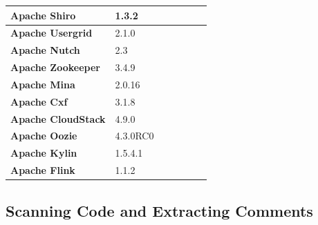 \begin{landscape}
\begin{table}[htbp]
\begin{adjustbox}{width=1.3\textwidth}
\begin{tabular}{l|l|l|c|c|c|c}
				\textbf{Apache Shiro}      & ‎1.3.2           &                           &                           &                   &                        &  \\ \hline
				\textbf{Apache Usergrid}   & 2.1.0            &                           &                           &                   &                        &  \\ \hline
				\textbf{Apache Nutch}      & 2.3              &                           &                           &                   &                        &  \\ \hline
				\textbf{Apache Zookeeper}  & 3.4.9            &                           &                           &                   &                        &  \\ \hline
				\textbf{Apache Mina}       & 2.0.16           &                           &                           &                   &                        &  \\ \hline
				\textbf{Apache Cxf}        & 3.1.8            &                           &                           &                   &                        &  \\ \hline
				\textbf{Apache CloudStack} & 4.9.0            &                           &                           &                   &                        &  \\ \hline
				\textbf{Apache Oozie}      & 4.3.0RC0         &                           &                           &                   &                        &  \\ \hline
				\textbf{Apache Kylin}      & 1.5.4.1          &                           &                           &                   &                        &  \\ \hline
				\textbf{Apache Flink}      & 1.1.2            &                           &                           &                   &                        &  \\ \hline
			\end{tabular}
			\label{table:ch4_projects_statistics_2}
			
		\end{adjustbox}
		
	\end{table}
	
\end{landscape}


\subsection{Scanning Code and Extracting Comments}

